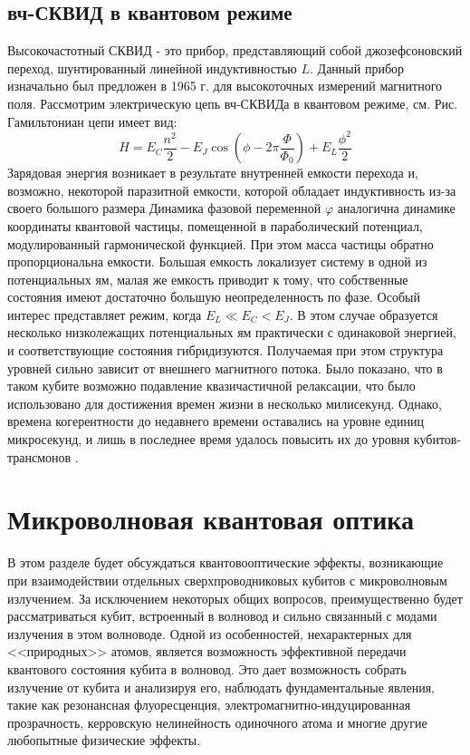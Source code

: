 \subsection{вч-СКВИД в квантовом режиме}
Высокочастотный СКВИД - это прибор, представляющий собой джозефсоновский переход, шунтированный линейной индуктивностью $L$. Данный прибор изначально был предложен в 1965 г. для высокоточных измерений магнитного поля. Рассмотрим электрическую цепь вч-СКВИДа в квантовом режиме, см. Рис. Гамильтониан цепи имеет вид:
\begin{equation}
H = E_C \frac{n^2}{2} - E_J\cos(\phi - 2\pi\frac{\Phi}{\Phi_0}) + E_L\frac{\phi^2}{2}
\label{eq: rf_squid_ham}
\end{equation}
Зарядовая энергия возникает в результате внутренней емкости перехода и, возможно, некоторой паразитной емкости, которой обладает индуктивность из-за своего большого размера
Динамика фазовой переменной $\varphi$ аналогична динамике координаты квантовой частицы, помещенной в параболический потенциал, модулированный гармонической функцией. При этом масса частицы обратно пропорциональна емкости. Большая емкость локализует систему в одной из потенциальных ям, малая же емкость приводит к тому, что собственные состояния имеют достаточно большую неопределенность по фазе. Особый интерес представляет режим, когда $E_L \ll E_C < E_J$. В этом случае образуется несколько низколежащих потенциальных ям практически с одинаковой энергией, и соответствующие состояния гибридизуются. Получаемая при этом структура уровней сильно зависит от внешнего магнитного потока. Было показано, что в таком кубите возможно подавление квазичастичной релаксации, что было использовано для достижения времен жизни в несколько милисекунд. Однако, времена когерентности до недавнего времени оставались на уровне единиц микросекунд, и лишь в последнее время удалось повысить их до уровня кубитов-трансмонов \cite{grunhaupt2019granular}. 
\section{Микроволновая квантовая оптика}
\label{sec: microwave qo}

В этом разделе будет обсуждаться квантовооптические эффекты, возникающие при взаимодействии отдельных сверхпроводниковых кубитов с микроволновым излучением. За исключением некоторых общих вопросов, преимущественно будет рассматриваться кубит, встроенный в волновод и сильно связанный с модами излучения в этом волноводе. Одной из особенностей, нехарактерных для <<природных>> атомов, является возможность эффективной передачи квантового состояния кубита в волновод. Это дает возможность собрать излучение от кубита и анализируя его, наблюдать фундаментальные явления, такие как резонансная флуоресценция, электромагнитно-индуцированная прозрачность, керровскую нелинейность одиночного атома и многие другие любопытные физические эффекты. 
